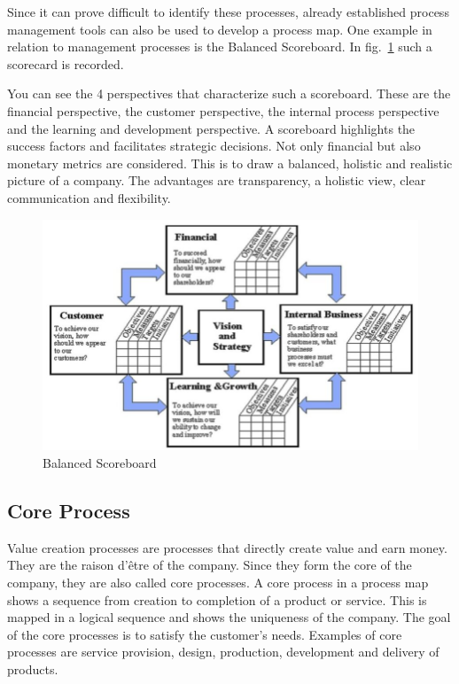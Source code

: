 \documentclass[11pt,a4paper]{article}
\begin{document}
Since it can prove difficult to identify these processes, already established
process management tools can also be used to develop a process map. One
example in relation to management processes is the Balanced Scoreboard. In
fig.~\ref{balance} such a scorecard is recorded.

You can see the 4 perspectives that characterize such a scoreboard. These are
the financial perspective, the customer perspective, the internal process
perspective and the learning and development perspective. A scoreboard
highlights the success factors and facilitates strategic decisions. Not only
financial but also monetary metrics are considered. This is to draw a
balanced, holistic and realistic picture of a company. The advantages are
transparency, a holistic view, clear communication and flexibility.

\begin{figure}[h] 
  \centering
     \includegraphics[width=\textwidth]{balanced-scorecard.png}
  \caption{Balanced Scoreboard \cite{9}}
  \label{balance}
\end{figure}

\subsection{Core Process}

Value creation processes are processes that directly create value and earn
money. They are the raison d'être of the company. Since they form the core of
the company, they are also called core processes. A core process in a process
map shows a sequence from creation to completion of a product or service. This
is mapped in a logical sequence and shows the uniqueness of the company. The
goal of the core processes is to satisfy the customer's needs. Examples of
core processes are service provision, design, production, development and
delivery of products.
\end{document}
